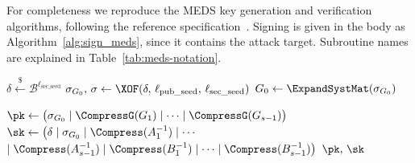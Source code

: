 
For completeness we reproduce the MEDS key generation and verification
algorithms, following the reference specification~\cite{ChouNPRRST23,MEDS_PQC}.
Signing is given in the body as Algorithm~\ref{alg:sign_meds}, since it
contains the attack target. Subroutine names are explained in
Table~\ref{tab:meds-notation}.

\begin{algorithm}[htbp]
\small
\setlength{\algomargin}{1.2em}
\caption{MEDS key generation (simplified)}
\label{alg:keygen_meds}
\KwIn{---}

$\delta \xleftarrow{\$} \mathcal{B}^{\ell_{\mathrm{sec\_seed}}}$\;
$\sigma_{G_0},\, \sigma \leftarrow \XOF(\delta,\, \ell_{\mathrm{pub\_seed}},\, \ell_{\mathrm{sec\_seed}})$\;
$G_0 \leftarrow \ExpandSystMat(\sigma_{G_0})$\;


$\pk \leftarrow \bigl(\sigma_{G_0} \mid \CompressG(G_1) \mid \cdots \mid \CompressG(G_{s-1})\bigr)$\;
$\sk \leftarrow \bigl(\delta \mid \sigma_{G_0} \mid \Compress(A_1^{-1}) \mid \cdots$
\Indp\Indp $\mid \Compress(A_{s-1}^{-1}) \mid \Compress(B_1^{-1}) \mid \cdots \mid \Compress(B_{s-1}^{-1})\bigr)$\;\Indm\Indm
\Return $\pk,\, \sk$
\end{algorithm}

